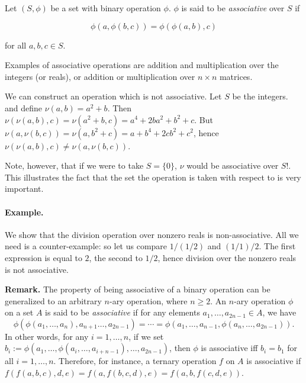 \documentclass[12pt]{article}
\begin{document}
Let $(S,\phi)$ be a set with binary operation $\phi$.  $\phi$ is said to be \emph{associative} over $S$ if 

$$ \phi(a,\phi(b,c)) = \phi(\phi(a,b),c) $$

for all $a,b,c \in S$.  

Examples of associative operations are addition and multiplication over the integers (or reals), or addition or multiplication over $n \times n$ matrices.

We can construct an operation which is not associative.  Let $S$ be the integers.  and define $\nu(a,b)=a^2+b$.  Then $\nu(\nu(a,b),c)=\nu(a^2+b,c)=a^4+2ba^2+b^2+c$.  But $\nu(a,\nu(b,c))=\nu(a,b^2+c)=a+b^4+2cb^2+c^2$, hence $\nu(\nu(a,b),c) \ne \nu(a,\nu(b,c))$. 

Note, however, that if we were to take $S=\{0\}$, $\nu$ would be associative over $S$!.  This illustrates the fact that the set the operation is taken with respect to is very important.

\paragraph{Example.}

We show that the division operation over nonzero reals is non-associative.  All we need is a counter-example: so let us compare $1/(1/2)$ and $(1/1)/2$.  The first expression is equal to $2$, the second to $1/2$, hence division over the nonzero reals is not associative.

\textbf{Remark.}  The property of being associative of a binary operation can be generalized to an arbitrary $n$-ary operation, where $n\ge 2$.  An $n$-ary operation $\phi$ on a set $A$ is said to be \emph{associative} if for any elements $a_1,\ldots, a_{2n-1} \in A$, we have
$$\phi(\phi(a_1,\ldots, a_n), a_{n+1} \ldots, a_{2n-1}) = \cdots = \phi(a_1, \ldots, a_{n-1}, \phi(a_n,\ldots, a_{2n-1})).$$
In other words, for any $i=1,\ldots, n$, if we set $b_i:=\phi (a_1,\ldots, \phi(a_i,\ldots, a_{i+n-1}),\ldots, a_{2n-1})$, then $\phi$ is associative iff $b_i=b_1$ for all $i=1,\ldots, n$.  Therefore, for instance, a ternary operation $f$ on $A$ is associative if $f(f(a,b,c),d,e)=f(a,f(b,c,d),e)=f(a,b,f(c,d,e))$.
\end{document}

